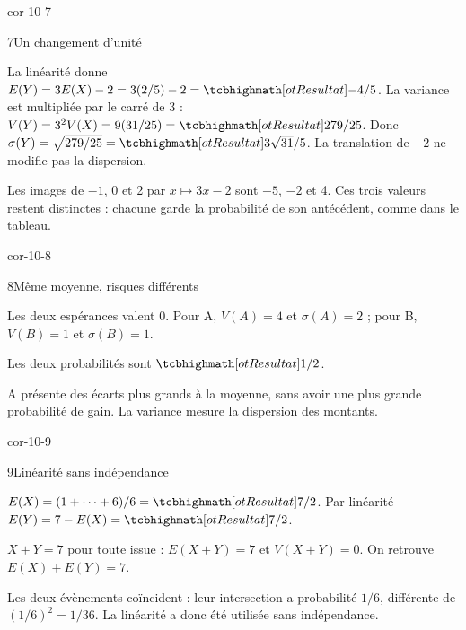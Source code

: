 \begin{blocLivre}{cor-10-7}
\begin{corrige}{7}{Un changement d'unité}
\begin{questions}
\item La linéarité donne $E(Y)=3E(X)-2=3(2/5)-2=\res{-4/5}$.
La variance est multipliée par le carré de 3 :
$V(Y)=3^2V(X)=9(31/25)=\res{279/25}$.
Donc $\sigma(Y)=\sqrt{279/25}=\res{3\sqrt{31}/5}$.
La translation de $-2$ ne modifie pas la dispersion.
\item Les images de $-1$, 0 et 2 par $x\mapsto3x-2$ sont $-5$, $-2$ et 4.
Ces trois valeurs restent distinctes : chacune garde la probabilité de son antécédent, comme dans le tableau.
\end{questions}

\label{figlivre-r10-07-loi-cor}

\end{corrige}
\end{blocLivre}
\begin{blocLivre}{cor-10-8}
\begin{corrige}{8}{Même moyenne, risques différents}
\begin{questions}
\item Les deux espérances valent 0. Pour A, $V(A)=4$ et $\sigma(A)=2$ ; pour B, $V(B)=1$ et $\sigma(B)=1$.
\item Les deux probabilités sont $\res{1/2}$.
\item A présente des écarts plus grands à la moyenne, sans avoir une plus grande probabilité de gain. La variance mesure la dispersion des montants.
\end{questions}
\end{corrige}
\end{blocLivre}
\begin{blocLivre}{cor-10-9}
\begin{corrige}{9}{Linéarité sans indépendance}
\begin{questions}
\item $E(X)=(1+\cdots+6)/6=\res{7/2}$. Par linéarité $E(Y)=7-E(X)=\res{7/2}$.
\item $X+Y=7$ pour toute issue : $E(X+Y)=7$ et $V(X+Y)=0$. On retrouve $E(X)+E(Y)=7$.
\item Les deux évènements coïncident : leur intersection a probabilité $1/6$, différente de $(1/6)^2=1/36$. La linéarité a donc été utilisée sans indépendance.
\end{questions}
\end{corrige}
\end{blocLivre}
